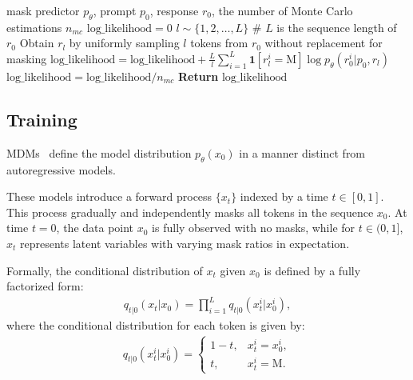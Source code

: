 \documentclass{article}
\begin{document}
\begin{algorithm}[t!]
    \caption{Conditional Log-likelihood Evaluation of LLaDA}
    \label{alg:likelihood}
    \begin{algorithmic}[1]
        \REQUIRE mask predictor $p_{\theta}$, prompt $p_0$, response $r_0$, the number of Monte Carlo estimations $n_{mc}$
        \STATE $\text{log}\_\text{likelihood}=0 $
                \STATE $l \sim \{1, 2, \dots, L\}$ \hfill \# $L$ is the sequence length of $r_0$
                \STATE Obtain \( r_l \) by uniformly sampling \( l \) tokens from \( r_0 \) without replacement for masking
                \STATE $\text{log}\_\text{likelihood} = \text{log}\_\text{likelihood} + \frac{L}{l} \sum_{i=1}^L \textbf{1}[r_l^i = \textrm{M}] \log p_{\theta}(r_0^i|p_0, r_l) $
            \ENDFOR
        \STATE $\text{log}\_\text{likelihood} = \text{log}\_\text{likelihood} / n_{mc} $
        \STATE \textbf{Return} $\text{log}\_\text{likelihood}$
    \end{algorithmic}
\end{algorithm}
 

\subsection{Training}
\label{app:for-train}

MDMs~\citep{austin2021structured,lou2023discrete,shi2024simplified,sahoo2024simple,ou2024your} define the model distribution \( p_\theta(x_0) \) in a manner distinct from autoregressive models.

These models introduce a forward process \( \{x_t\} \) indexed by a time \( t \in [0, 1] \). This process gradually and independently masks all tokens in the sequence \( x_0 \). At time \( t = 0 \), the data point \( x_0 \) is fully observed with no masks, while for \( t \in (0, 1] \), \( x_t \) represents latent variables with varying mask ratios in expectation.

Formally, the conditional distribution of \( x_t \) given \( x_0 \) is defined by a fully factorized form:
\begin{align}
\label{eq:forward-app}
    q_{t|0}(x_t|x_0) = \prod_{i=1}^{L} q_{t|0}(x_t^i|x_0^i),
\end{align}
where the conditional distribution for each token is given by:
\begin{align}
    q_{t|0}(x_t^i|x_0^i) = 
    \begin{cases}
        1 - t, & x_t^i = x_0^i, \\
        t, & x_t^i = \textrm{M}.
    \end{cases}
\end{align}
\end{document}
